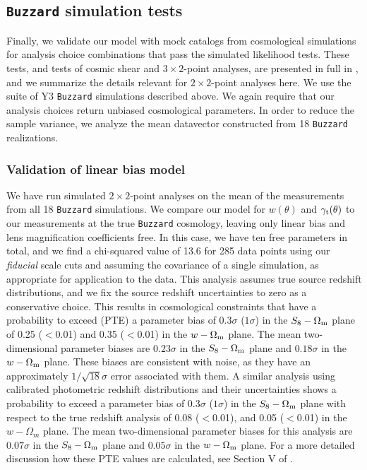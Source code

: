 \documentclass[aps, prd,twocolumn,superscriptaddress,nofootinbib,preprintnumbers]{revtex4-1}
\newcommand{\mice}{\texttt{MICE} }
\newcommand{\buzzard}{\texttt{Buzzard} }
\newcommand{\blue}[1]{\textcolor{blue}{#1}}
\begin{document}
\subsection{\buzzard simulation tests}
\label{sec:sims}
Finally, we validate our model with mock catalogs from cosmological simulations for analysis choice combinations that pass the simulated likelihood tests. These tests, and tests of cosmic shear and $3\times2$-point analyses, are presented in full in \citet*{y3-simvalidation}, and we summarize the details relevant for $2\times2$-point analyses here. We use the suite of Y3 \buzzard simulations described above. We again require that our analysis choices return unbiased cosmological parameters. In order to reduce the sample variance, we analyze the mean datavector constructed from 18 \buzzard realizations. 

\subsubsection{Validation of linear bias model}
We have run simulated $2\times 2$-point analyses on the mean of the measurements from all 18 \buzzard simulations. We compare our model for $w(\theta)$ and $\gamma_{\rm t}(\theta)$ to our measurements at the true \buzzard cosmology, leaving only linear bias and lens magnification coefficients free. In this case, we have ten free parameters in total, and we find a chi-squared value of 13.6 for 285 data points using our \textit{fiducial} scale cuts and assuming the covariance of a single simulation, as appropriate for application to the data. This analysis assumes true source redshift distributions, and we fix the source redshift uncertainties to zero as a conservative choice. This results in cosmological constraints that have a probability to exceed (PTE) a parameter bias of $0.3\sigma$ ($1\sigma$) in the $S_8-\Omega_{\rm m}$ plane of 0.25 ($<$0.01) and 0.35 ($<$0.01) in the $w-\Omega_{\rm m}$ plane. The mean two-dimensional parameter biases are $0.23\sigma$ in the $S_8-\Omega_{\rm m}$ plane and $0.18\sigma$ in the $w-\Omega_{\rm m}$ plane. These biases are consistent with noise, as they have an approximately $1/\sqrt{18}\sigma$ error associated with them. A similar analysis using calibrated photometric redshift distributions and their uncertainties shows a probability to exceed a parameter bias of $0.3\sigma$ ($1\sigma$) in the $S_8-\Omega_{\rm m}$ plane with respect to the true redshift analysis of 0.08 ($<$0.01), and 0.05 ($<$0.01) in the $w-\Omega_{m}$ plane. The mean two-dimensional parameter biases for this analysis are $0.07\sigma$ in the $S_8-\Omega_{\rm m}$ plane and $0.05\sigma$ in the $w-\Omega_{\rm m}$ plane. For a more detailed discussion how these PTE values are calculated, see Section V of \citet*{y3-simvalidation}.
\end{document}
